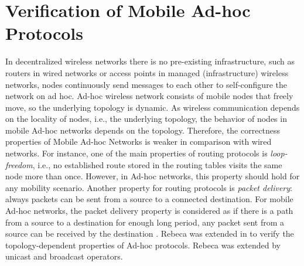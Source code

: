 \section{Verification of Mobile Ad-hoc Protocols}\label{sec::wrebeca} 
	In decentralized wireless networks there is no pre-existing infrastructure, such as routers in wired networks or access points in managed (infrastructure) wireless networks, nodes continuously send messages to each other to self-configure the network on ad hoc. %
	Ad-hoc wireless network consists of mobile nodes that freely move, so the underlying topology is dynamic. As wireless communication depends on the locality of nodes, i.e., the underlying topology, the behavior of nodes in mobile Ad-hoc networks depends on the topology. Therefore, the correctness properties of Mobile Ad-hoc Networks is weaker in comparison with wired networks. For instance, one of the main properties of routing protocols is \emph{loop-freedom}, i.e., no established route stored in the routing tables visits the same node more than once. However, in Ad-hoc networks, this property should hold for any mobility scenario. Another property for routing protocols is \emph{packet delivery}: always packets can be sent from a source to a connected destination. For mobile Ad-hoc networks, the packet delivery property is considered as if there is a path from a source to a destination for enough long period, any packet sent from a source can be received by the destination \cite{GlabbeekAWN}. Rebeca was extended in \cite{FOAC} to verify the topology-dependent properties of Ad-hoc protocols. Rebeca was extended by unicast and broadcast operators. %
	
